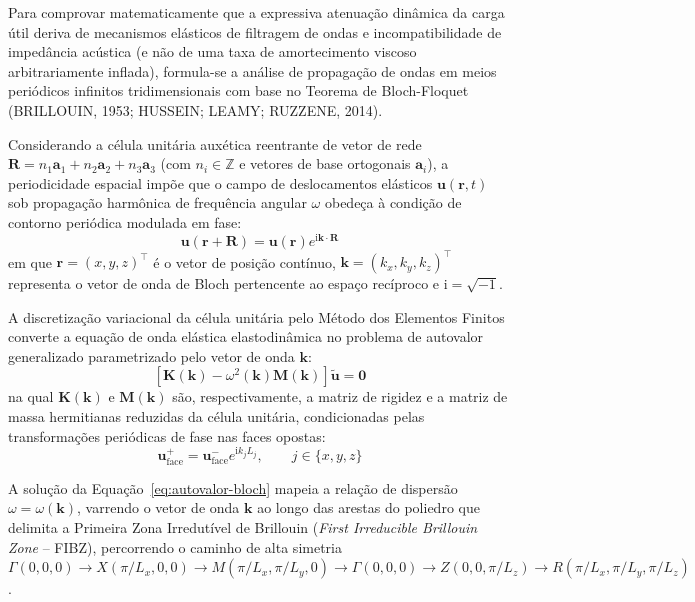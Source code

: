 Para comprovar matematicamente que a expressiva atenuação dinâmica da carga útil deriva de mecanismos elásticos de filtragem de ondas e incompatibilidade de impedância acústica (e não de uma taxa de amortecimento viscoso arbitrariamente inflada), formula-se a análise de propagação de ondas em meios periódicos infinitos tridimensionais com base no Teorema de Bloch-Floquet (BRILLOUIN, 1953; HUSSEIN; LEAMY; RUZZENE, 2014).

Considerando a célula unitária auxética reentrante de vetor de rede $\mathbf{R} = n_1 \mathbf{a}_1 + n_2 \mathbf{a}_2 + n_3 \mathbf{a}_3$ (com $n_i \in \mathbb{Z}$ e vetores de base ortogonais $\mathbf{a}_i$), a periodicidade espacial impõe que o campo de deslocamentos elásticos $\mathbf{u}(\mathbf{r}, t)$ sob propagação harmônica de frequência angular $\omega$ obedeça à condição de contorno periódica modulada em fase:
\begin{equation}
  \mathbf{u}(\mathbf{r} + \mathbf{R}) = \mathbf{u}(\mathbf{r}) e^{\mathrm{i} \mathbf{k} \cdot \mathbf{R}}
  \label{eq:bloch}
\end{equation}
em que $\mathbf{r} = (x, y, z)^\top$ é o vetor de posição contínuo, $\mathbf{k} = (k_x, k_y, k_z)^\top$ representa o vetor de onda de Bloch pertencente ao espaço recíproco e $\mathrm{i} = \sqrt{-1}$.

A discretização variacional da célula unitária pelo Método dos Elementos Finitos converte a equação de onda elástica elastodinâmica no problema de autovalor generalizado parametrizado pelo vetor de onda $\mathbf{k}$:
\begin{equation}
  \left[ \mathbf{K}(\mathbf{k}) - \omega^2(\mathbf{k}) \mathbf{M}(\mathbf{k}) \right] \tilde{\mathbf{u}} = \mathbf{0}
  \label{eq:autovalor-bloch}
\end{equation}
na qual $\mathbf{K}(\mathbf{k})$ e $\mathbf{M}(\mathbf{k})$ são, respectivamente, a matriz de rigidez e a matriz de massa hermitianas reduzidas da célula unitária, condicionadas pelas transformações periódicas de fase nas faces opostas:
\begin{equation}
  \mathbf{u}_{\text{face}}^{+} = \mathbf{u}_{\text{face}}^{-} e^{\mathrm{i} k_j L_j}, \qquad j \in \{x, y, z\}
  \label{eq:pbc-fase}
\end{equation}

A solução da Equação~\eqref{eq:autovalor-bloch} mapeia a relação de dispersão $\omega = \omega(\mathbf{k})$, varrendo o vetor de onda $\mathbf{k}$ ao longo das arestas do poliedro que delimita a Primeira Zona Irredutível de Brillouin (\textit{First Irreducible Brillouin Zone} -- FIBZ), percorrendo o caminho de alta simetria $\Gamma (0,0,0) \to X (\pi/L_x, 0, 0) \to M (\pi/L_x, \pi/L_y, 0) \to \Gamma (0,0,0) \to Z (0, 0, \pi/L_z) \to R (\pi/L_x, \pi/L_y, \pi/L_z)$.

